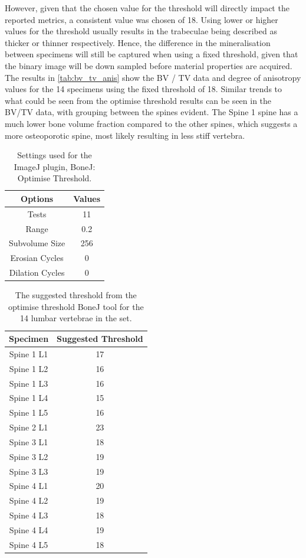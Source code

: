 However, given that the chosen value for the threshold will directly impact the
reported metrics, a consistent value was chosen of 18. Using lower or higher
values for the threshold usually results in the trabeculae being described as
thicker or thinner respectively.
Hence, the difference in the mineralisation between specimens will still be
captured when using a fixed threshold, given that the binary image will be down
sampled before material properties are acquired.
The results in \cref{tab:bv_tv_anis} show the BV / TV data and degree of
anisotropy values for the 14 specimens using the fixed threshold of 18.
Similar trends to what could be seen from the optimise threshold results can be
seen in the BV/TV data, with grouping between the
spines evident.
The Spine 1 spine has a much lower bone volume fraction compared to the other
spines, which suggests a more osteoporotic spine, most likely resulting in less
stiff vertebra.

\begin{table}[ht!]
	\caption{Settings used for the ImageJ plugin, BoneJ: Optimise Threshold.}
	\label{tab:bonej}
	\centering
	\begin{tabular}{c|c}
    Options & Values \\
    \hline
    \hline
    Tests & 11  \\
    Range & 0.2 \\
    Subvolume Size & 256 \\
    Erosian Cycles & 0 \\
    Dilation Cycles & 0 \\
    \hline
	\end{tabular}
\end{table}

\begin{table}[ht!]
	\caption{The suggested threshold from the optimise threshold BoneJ tool for
the 14 lumbar vertebrae in the set.}
	\label{tab:optTH}
	\centering
	\begin{tabular}{c|c}
    Specimen    & Suggested Threshold   \\ \hline \hline
    Spine 1 L1 & 17 \\
    Spine 1 L2 & 16\\
    Spine 1 L3 & 16\\
    Spine 1 L4 & 15\\
    Spine 1 L5 & 16\\
    Spine 2 L1 & 23\\
    Spine 3 L1 & 18\\
    Spine 3 L2 & 19\\
    Spine 3 L3 & 19\\
    Spine 4 L1 & 20\\
    Spine 4 L2 & 19\\
    Spine 4 L3 & 18\\
    Spine 4 L4 & 19\\
    Spine 4 L5 & 18\\
    \hline
	\end{tabular}
\end{table}




